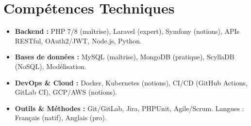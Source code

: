 \documentclass[a4paper,11pt]{article}
\begin{document}
\section{Compétences Techniques}
\begin{itemize}[leftmargin=*, nosep]
    \item \small{\textbf{Backend :} PHP 7/8 (maîtrise), Laravel (expert), Symfony (notions), APIs RESTful, OAuth2/JWT, Node.js, Python.}
    \item \small{\textbf{Bases de données :} MySQL (maîtrise), MongoDB (pratique), ScyllaDB (NoSQL), Modélisation.}
    \item \small{\textbf{DevOps \& Cloud :} Docker, Kubernetes (notions), CI/CD (GitHub Actions, GitLab CI), GCP/AWS (notions).}
    \item \small{\textbf{Outils \& Méthodes :} Git/GitLab, Jira, PHPUnit, Agile/Scrum. Langues : Français (natif), Anglais (pro).}
\end{itemize}

\end{document}
